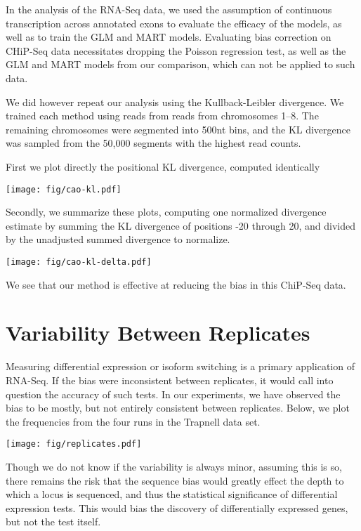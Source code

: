 \documentclass[letterpaper]{article}
\begin{document}
In the analysis of the RNA-Seq data, we used the assumption of continuous
transcription across annotated exons to evaluate the efficacy of the models, as
well as to train the GLM and MART models. Evaluating bias correction on CHiP-Seq
data necessitates dropping the Poisson regression test, as well as the GLM and
MART models from our comparison, which can not be applied to such data.

We did however repeat our analysis using the Kullback-Leibler divergence.  We
trained each method using reads from reads from chromosomes 1--8. The remaining
chromosomes were segmented into 500nt bins, and the KL divergence was sampled
from the 50,000 segments with the highest read counts.

First we plot directly the positional KL divergence, computed identically 

\begin{center}
\texttt{[image: fig/cao-kl.pdf]}
\end{center}

Secondly, we summarize these plots, computing one normalized divergence
estimate by summing the KL divergence of positions -20 through 20, and
divided by the unadjusted summed divergence to normalize.

\begin{center}
\texttt{[image: fig/cao-kl-delta.pdf]}
\end{center}

We see that our method is effective at reducing the bias in this ChiP-Seq data.


\section{Variability Between Replicates}

Measuring differential expression or isoform switching is a primary application of
RNA-Seq. If the bias were inconsistent between replicates, it would call into
question the accuracy of such tests. In our experiments, we have observed the
bias to be mostly, but not entirely consistent between replicates. Below, we
plot the frequencies from the four runs in the Trapnell data set.

\begin{center}
\texttt{[image: fig/replicates.pdf]}
\end{center}

Though we do not know if the variability is always minor, assuming this is so,
there remains the risk that the sequence bias would greatly effect the depth to
which a locus is sequenced, and thus the statistical significance of
differential expression tests. This would bias the discovery of differentially
expressed genes, but not the test itself.
\end{document}
